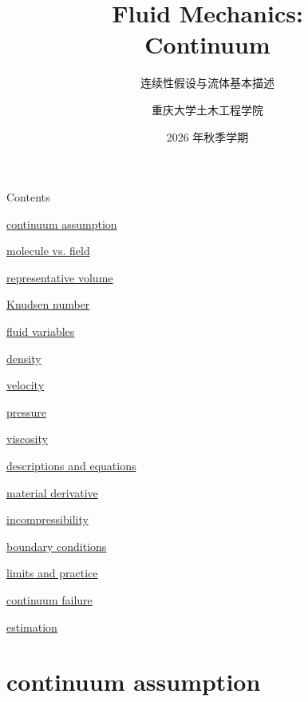 \documentclass[UTF8,9pt]{ctexbeamer}
\author{重庆大学土木工程学院}
\title{Fluid Mechanics:\\[3pt]Continuum}
\subtitle{连续性假设与流体基本描述}
\date{2026 年秋季学期}
\newcommand{\toclink}[2]{\hyperlink{#1}{#2}}
\begin{document}
\begin{frame}
\titlepage
\end{frame}

\begin{frame}{Contents}
\footnotesize
\begin{multicols}{2}
\toclink{molecule}{\textcolor{blue!70!black}{continuum assumption}}

\hspace{.25cm}\toclink{molecule}{molecule vs. field}

\hspace{.25cm}\toclink{rev}{representative volume}

\hspace{.25cm}\toclink{kn}{Knudsen number}

\vspace{.24cm}
\toclink{density}{\textcolor{blue!70!black}{fluid variables}}

\hspace{.25cm}\toclink{density}{density}

\hspace{.25cm}\toclink{velocity}{velocity}

\hspace{.25cm}\toclink{pressure}{pressure}

\hspace{.25cm}\toclink{viscosity}{viscosity}

\vspace{.24cm}
\toclink{material}{\textcolor{blue!70!black}{descriptions and equations}}

\hspace{.25cm}\toclink{material}{material derivative}

\hspace{.25cm}\toclink{incompressible}{incompressibility}

\hspace{.25cm}\toclink{noslip}{boundary conditions}

\vspace{.24cm}
\toclink{failure}{\textcolor{blue!70!black}{limits and practice}}

\hspace{.25cm}\toclink{failure}{continuum failure}

\hspace{.25cm}\toclink{practice}{estimation}
\end{multicols}
\end{frame}

\section{continuum assumption}
\end{document}
